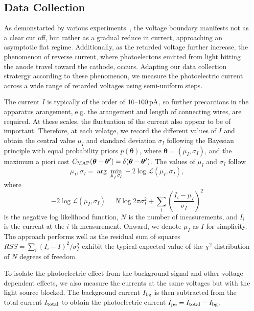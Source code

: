 \documentclass[aps,twocolumn,secnumarabic,balancelastpage,amsmath,amssymb,nofootinbib,floatfix]{revtex4-1}
\newcommand{\pA}{\,{\rm pA}}
\begin{document}
\subsection{Data Collection}
\label{sec:data_collection}

As demonstarted by various experiments~\citep[e.g.][]{Millikan1916,Quinn1964,Wong2011}, the voltage boundary manifests not as a clear cut off, but rather as a gradual reduce in currect, approaching an asymptotic flat regime. Additionally, as the retarded voltage further increase, the phenomenon of reverse current, where photoelectons emitted from light hitting the anode travel toward the cathode, occurs. Adapting our data collection stratergy according to these phenomenon, we measure the photoelectric current across a wide range of retarded voltages using semi-uniform steps. 

The current $I$ is typically of the order of $10 \text{--} 100\pA$, so further precautions in the apparatus arangement, e.g. the arangement and length of connecting wires, are required. At these scales, the fluctuation of the current also appear to be of important. Therefore, at each volatge, we record the different values of $I$ and obtain the central value $\mu_I$ and standard deviation $\sigma_I$ following the Bayesian principle with equal probability priors $p(\boldsymbol{\theta})$, where $\boldsymbol{\theta} = (\mu_I,\sigma_I)$, and the maximum a piori cost $C_{\rm{MAP}} (\boldsymbol{\theta} - \boldsymbol{\theta^\prime}) = \delta (\boldsymbol{\theta} - \boldsymbol{\theta^\prime})$. The values of $\mu_I$ and $\sigma_I$ follow
\begin{equation}
    \label{eqn:I_bayesian}
    \mu_I,\sigma_I =  \arg \min_{\mu_I,\sigma_I} - 2 \log{\mathcal{L} (\mu_I,\sigma_I)},
\end{equation}
where
\begin{equation}
    \label{eqn:I_NLL}
    - 2 \log{\mathcal{L} (\mu_I,\sigma_I)} = N \log{2 \pi \sigma_I^2} + \sum_i \left(\frac{I_i - \mu_I}{\sigma_I}\right)^2
\end{equation}
is the negative log likelihood function, $N$ is the number of measurements, and $I_i$ is the current at the $i$-th measurement. Onward, we denote $\mu_I$ as $I$ for simplicity. The approach performs well as the residual sum of squares $RSS = \sum_i (I_i - I)^2 / \sigma_I^2$ exhibit the typical expected value of the $\chi^2$ distribution of $N$ degrees of freedom.

To isolate the photoelectric effect from the background signal and other voltage-dependent effects, we also measure the currents at the same voltages but with the light source blocked. The background current $I_{\rm{bg}}$ is then subtracted from the total current $I_{\rm{total}}$ to obtain the photoelectric current $I_{\rm{pe}} = I_{\rm{total}} - I_{\rm{bg}}$.
\end{document}
